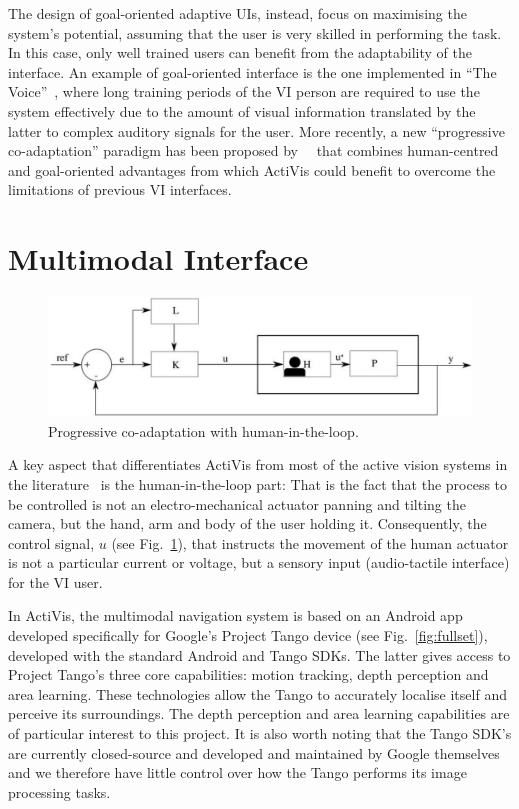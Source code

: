 \documentclass[letterpaper]{article}
\begin{document}
The design of goal-oriented adaptive UIs, instead, focus on maximising the system's potential, assuming that the user is very skilled in performing the task. In this case, only well trained users can benefit from the adaptability of the interface. An example of goal-oriented interface is the one implemented in ``The Voice''~\cite{meijer2010}, where long training periods of the VI person are required to use the system effectively due to the amount of visual information translated by the latter to complex auditory signals for the user. More recently, a new ``progressive co-adaptation'' paradigm has been proposed by~\citeauthor{gallina2015}~\cite{gallina2015} that combines human-centred and goal-oriented advantages from which ActiVis could benefit to overcome the limitations of previous VI interfaces.

\section{Multimodal Interface}\label{sec:multimodal}

\begin{figure}
  \centering
  \includegraphics[width=0.8\columnwidth]{figures/loop.jpg}
  \caption{Progressive co-adaptation with human-in-the-loop.\label{fig:loop}}
\end{figure}

A key aspect that differentiates ActiVis from most of the active vision systems in the literature~\cite{Rivlin2000} is the human-in-the-loop part: That is the fact that the process to be controlled is not an electro-mechanical actuator panning and tilting the camera, but the hand, arm and body of the user holding it. Consequently, the control signal, $u$ (see Fig.~\ref{fig:loop}), that instructs the movement of the human actuator is not a particular current or voltage, but a sensory input (audio-tactile interface) for the VI user. 

In ActiVis, the multimodal navigation system is based on an Android app developed specifically for Google's Project Tango device (see Fig.~\ref{fig:fullset}), developed with the standard Android and Tango SDKs. The latter gives access to Project Tango's three core capabilities: motion tracking, depth perception and area learning. These technologies allow the Tango to accurately localise itself and perceive its surroundings. The depth perception and area learning capabilities are of particular interest to this project. It is also worth noting that the Tango SDK's are currently closed-source and developed and maintained by Google themselves and we therefore have little control over how the Tango performs its image processing tasks. 
\end{document}
